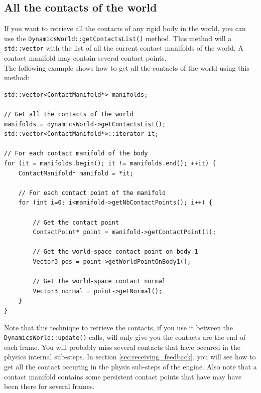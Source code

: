 \documentclass[a4paper,12pt]{article}
\begin{document}
    \subsection{All the contacts of the world}

    If you want to retrieve all the contacts of any rigid body in the world, you can use the \texttt{DynamicsWorld::getContactsList()} method. This method will
    a \texttt{std::vector} with the list of all the current contact manifolds of the world. A contact manifold may contain several contact points. \\

    The following example shows how to get all the contacts of the world using this method: \\

    \begin{lstlisting}
std::vector<ContactManifold*> manifolds;

// Get all the contacts of the world
manifolds = dynamicsWorld->getContactsList();
std::vector<ContactManifold*>::iterator it;

// For each contact manifold of the body
for (it = manifolds.begin(); it != manifolds.end(); ++it) {
    ContactManifold* manifold = *it;

    // For each contact point of the manifold
    for (int i=0; i<manifold->getNbContactPoints(); i++) {

        // Get the contact point
        ContactPoint* point = manifold->getContactPoint(i);

        // Get the world-space contact point on body 1
        Vector3 pos = point->getWorldPointOnBody1();

        // Get the world-space contact normal
        Vector3 normal = point->getNormal();
    }
}
    \end{lstlisting}

     \vspace{0.6cm}

    Note that this technique to retrieve the contacts, if you use it between the \texttt{DynamicsWorld::update()} calls, will only give you the contacts are the end of
    each frame. You will probably miss several contacts that have occured in the physics internal sub-steps. In section \ref{sec:receiving_feedback}, you will
    see how to get all the contact occuring in the physis sub-steps of the engine. Also note that a contact manifold contains some persistent contact points that
    have may have been there for several frames.
\end{document}
